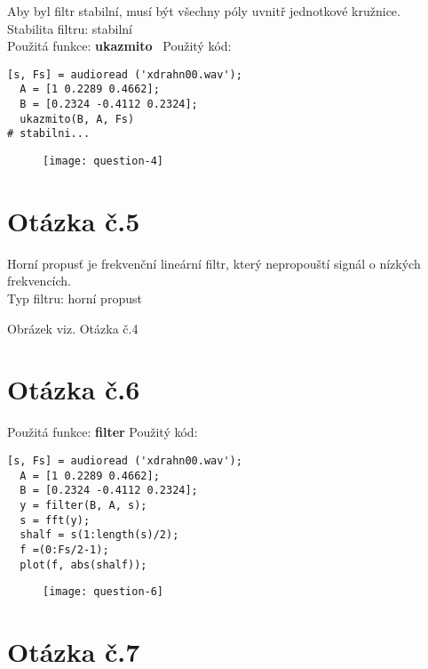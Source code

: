 \documentclass[a4paper,11pt]{article}
\begin{document}
Aby byl filtr stabilní, musí být všechny póly uvnitř
jednotkové kružnice.\\
\newline
Stabilita filtru: stabilní\\
\newline
Použitá funkce: \textbf{ukazmito}\
\newline
\newline
Použitý kód:
\lstset{language=Matlab}
\begin{lstlisting}[frame=single,breaklines]
  [s, Fs] = audioread ('xdrahn00.wav');
  A = [1 0.2289 0.4662];
  B = [0.2324 -0.4112 0.2324];
  ukazmito(B, A, Fs)
# stabilni...
\end{lstlisting}

\begin{figure}[h]
  \centering
  \texttt{[image: question-4]}
\end{figure}

\section{Otázka č.5}
Horní propusť je frekvenční lineární filtr, který nepropouští signál o nízkých frekvencích.\\
\newline
Typ filtru: horní propust\\
\newline

Obrázek viz. Otázka č.4

\section{Otázka č.6}

Použitá funkce: \textbf{filter}
\newline
\newline
Použitý kód:
\lstset{language=Matlab}
\begin{lstlisting}[frame=single,breaklines]
  [s, Fs] = audioread ('xdrahn00.wav');
  A = [1 0.2289 0.4662];
  B = [0.2324 -0.4112 0.2324];
  y = filter(B, A, s);
  s = fft(y);
  shalf = s(1:length(s)/2);
  f =(0:Fs/2-1);
  plot(f, abs(shalf));
\end{lstlisting}

\begin{figure}[h]
  \centering
  \texttt{[image: question-6]}
\end{figure}

\section{Otázka č.7}
\end{document}
